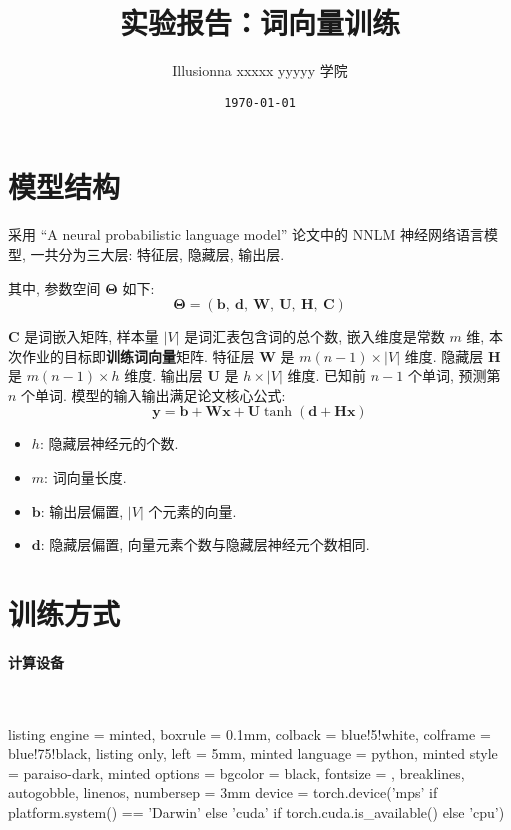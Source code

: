 \documentclass[draft]{article}
\title{实验报告：词向量训练}
\author{Illusionna \quad xxxxx \quad yyyyy 学院}
\date{\tt\today}
\begin{document}
\maketitle

\section{模型结构}
采用 ``A neural probabilistic language model'' 论文中的 NNLM 神经网络语言模型, 一共分为三大层: 特征层, 隐藏层, 输出层.


其中, 参数空间 $\bm{\Theta}$ 如下:
\[ \bm{\Theta} = (\bm{b},\ \bm{d},\ \bm{W},\ \bm{U},\ \bm{H},\ \bm{C}) \]

$\bm{C}$ 是词嵌入矩阵, 样本量 $|V|$ 是词汇表包含词的总个数, 嵌入维度是常数 $m$ 维, 本次作业的目标即\textbf{训练词向量}矩阵. 特征层 $\bm{W}$ 是 $m(n - 1)\times|V|$ 维度. 隐藏层 $\bm{H}$ 是 $m(n-1)\times h$ 维度. 输出层 $\bm{U}$ 是 $h\times|V|$ 维度. 已知前 $n-1$ 个单词, 预测第 $n$ 个单词. 模型的输入输出满足论文核心公式:
\[ \bm{y} = \bm{b} + \bm{W}\bm{x} + \bm{U}\tanh(\bm{d} + \bm{H}\bm{x}) \]

\begin{itemize}
    \item $h$: 隐藏层神经元的个数.
    \item $m$: 词向量长度.
    \item $\bm{b}$: 输出层偏置, $|V|$ 个元素的向量.
    \item $\bm{d}$: 隐藏层偏置, 向量元素个数与隐藏层神经元个数相同.
\end{itemize}



\section{训练方式}

\paragraph*{计算设备}~{}

\begin{tcblisting}{
    listing engine = minted,
    boxrule = 0.1mm,
    colback = blue!5!white,
    colframe = blue!75!black,
    listing only,
    left = 5mm,
    minted language = python,
    minted style = paraiso-dark,
    minted options = {bgcolor = black, fontsize = \small, breaklines, autogobble, linenos, numbersep = 3mm}
}
device = torch.device('mps' if platform.system() == 'Darwin' else 'cuda' if torch.cuda.is_available() else 'cpu')
\end{tcblisting}
\end{document}

